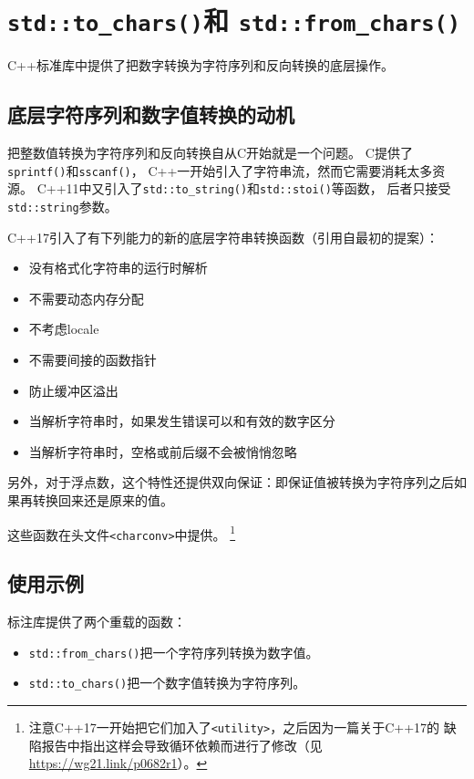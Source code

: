\chapter{\texttt{std::to\_chars()}和
\texttt{std::from\_chars()}}\label{ch31}
C++标准库中提供了把数字转换为字符序列和反向转换的底层操作。


\section{底层字符序列和数字值转换的动机}
把整数值转换为字符序列和反向转换自从C开始就是一个问题。
C提供了\texttt{sprintf()}和\texttt{sscanf()}，
C++一开始引入了字符串流，然而它需要消耗太多资源。
C++11中又引入了\texttt{std::to\_string()}和\texttt{std::stoi()}等函数，
后者只接受\texttt{std::string}参数。

C++17引入了有下列能力的新的底层字符串转换函数（引用自最初的提案）：
\begin{itemize}
    \item 没有格式化字符串的运行时解析
    \item 不需要动态内存分配
    \item 不考虑locale
    \item 不需要间接的函数指针
    \item 防止缓冲区溢出
    \item 当解析字符串时，如果发生错误可以和有效的数字区分
    \item 当解析字符串时，空格或前后缀不会被悄悄忽略
\end{itemize}
另外，对于浮点数，这个特性还提供双向保证：即保证值被转换为字符序列之后如果再转换回来还是原来的值。

这些函数在头文件\texttt{<charconv>}中提供。
\footnote{注意C++17一开始把它们加入了\texttt{<utility>}，之后因为一篇关于C++17的
缺陷报告中指出这样会导致循环依赖而进行了修改（见\url{https://wg21.link/p0682r1}）。}


\section{使用示例}
标注库提供了两个重载的函数：
\begin{itemize}
    \item \texttt{std::from\_chars()}把一个字符序列转换为数字值。
    \item \texttt{std::to\_chars()}把一个数字值转换为字符序列。
\end{itemize}

